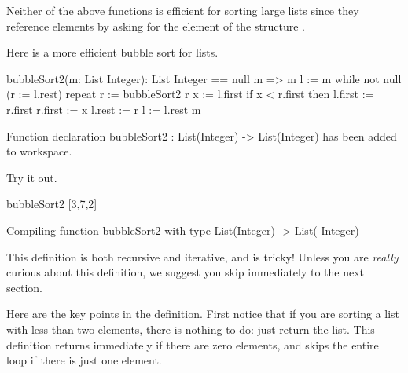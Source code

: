 Neither of the above functions is efficient for sorting large lists since
they reference elements by asking for the  element of the
structure .

\begin{xtc}
\begin{xtccomment}
Here is a more efficient bubble sort for lists.
\end{xtccomment}
\begin{spadsrc}
bubbleSort2(m: List Integer): List Integer ==
  null m => m
  l := m
  while not null (r := l.rest) repeat
     r := bubbleSort2 r
     x := l.first
     if x < r.first then
       l.first := r.first
       r.first := x
     l.rest := r
     l := l.rest
  m
\end{spadsrc}
\begin{MessageOutput}
   Function declaration bubbleSort2 : List(Integer) -> List(Integer) 
      has been added to workspace.
\end{MessageOutput}
\end{xtc}
\begin{xtc}
\begin{xtccomment}
Try it out.
\end{xtccomment}
\begin{spadsrc}
bubbleSort2 [3,7,2]
\end{spadsrc}
\begin{MessageOutput}
   Compiling function bubbleSort2 with type List(Integer) -> List(
      Integer) 
\end{MessageOutput}
\begin{TeXOutput}
\begin{fricasmath}{14}
%
\end{fricasmath}
\end{TeXOutput}
\end{xtc}

This definition is both recursive and iterative, and is tricky!
Unless you are {\it really} curious about this definition,
we suggest you skip immediately to the next section.

Here are the key points in the definition.
First notice that if you are sorting a list with less than two elements,
there is nothing to do: just return the list.
This definition returns immediately if there are zero elements, and skips
the entire  loop if there is just one element.

